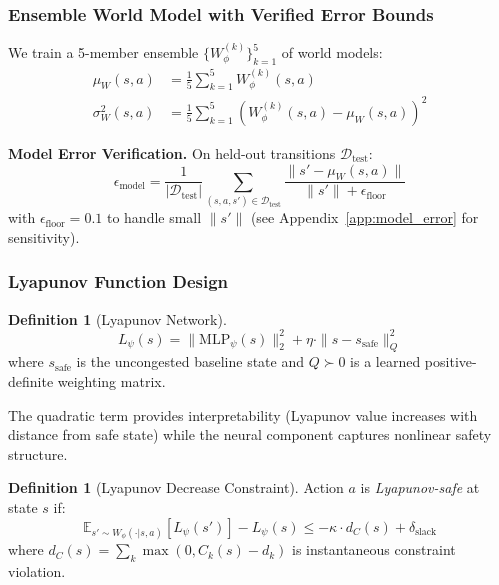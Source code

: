 \documentclass{article}
\theoremstyle{plain}
\theoremstyle{definition}
\newtheorem{definition}[theorem]{Definition}
\theoremstyle{remark}
\begin{document}
\subsubsection{Ensemble World Model with Verified Error Bounds}

We train a 5-member ensemble $\{W_\phi^{(k)}\}_{k=1}^5$ of world models:
\begin{align}
\mu_W(s, a) &= \frac{1}{5}\sum_{k=1}^5 W_\phi^{(k)}(s, a) \label{eq:ensemble_mean}\\
\sigma_W^2(s, a) &= \frac{1}{5}\sum_{k=1}^5 \left(W_\phi^{(k)}(s, a) - \mu_W(s, a)\right)^2 \label{eq:ensemble_var}
\end{align}

\textbf{Model Error Verification.} On held-out transitions $\mathcal{D}_{\text{test}}$:
\begin{equation}
\epsilon_{\text{model}} = \frac{1}{|\mathcal{D}_{\text{test}}|}\sum_{(s,a,s') \in \mathcal{D}_{\text{test}}} \frac{\|s' - \mu_W(s, a)\|}{\|s'\| + \epsilon_{\text{floor}}}
\label{eq:model_error}
\end{equation}
with $\epsilon_{\text{floor}} = 0.1$ to handle small $\|s'\|$ (see Appendix~\ref{app:model_error} for sensitivity).

\subsubsection{Lyapunov Function Design}

\begin{definition}[Lyapunov Network]
\label{def:lyapunov}
\begin{equation}
L_\psi(s) = \|\text{MLP}_\psi(s)\|_2^2 + \eta \cdot \|s - s_{\text{safe}}\|_Q^2
\label{eq:lyapunov}
\end{equation}
where $s_{\text{safe}}$ is the uncongested baseline state and $Q \succ 0$ is a learned positive-definite weighting matrix.
\end{definition}

The quadratic term provides interpretability (Lyapunov value increases with distance from safe state) while the neural component captures nonlinear safety structure.

\begin{definition}[Lyapunov Decrease Constraint]
\label{def:lyap_decrease}
Action $a$ is \emph{Lyapunov-safe} at state $s$ if:
\begin{equation}
\mathbb{E}_{s' \sim W_\phi(\cdot|s,a)}[L_\psi(s')] - L_\psi(s) \leq -\kappa \cdot d_C(s) + \delta_{\text{slack}}
\label{eq:lyap_constraint}
\end{equation}
where $d_C(s) = \sum_k \max(0, C_k(s) - d_k)$ is instantaneous constraint violation.
\end{definition}
\end{document}
